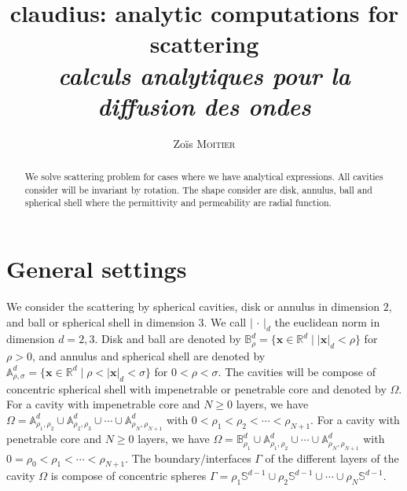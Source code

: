 \documentclass[12pt,a4paper]{article}
\title{claudius: analytic computations for scattering \\ \Large \emph{calculs analytiques pour la diffusion des ondes}}
\author{Zoïs \textsc{Moitier}}
\theoremstyle{definition}
\theoremstyle{plain}
\theoremstyle{remark}
\newcommand{\bbA}{\mathbb{A}}
\newcommand{\bbB}{\mathbb{B}}
\newcommand{\bbR}{\mathbb{R}}
\newcommand{\bbS}{\mathbb{S}}
\newcommand{\abs}[1]{\left\lvert#1\right\rvert}
\newcommand{\vx}{\boldsymbol{x}}
\begin{document}
\maketitle

\begin{abstract}
    We solve scattering problem for cases where we have analytical expressions.
    All cavities consider will be invariant by rotation.
    The shape consider are disk, annulus, ball and spherical shell where the permittivity and permeability are radial function.
\end{abstract}

\tableofcontents

\section{General settings}

We consider the scattering by spherical cavities, disk or annulus in dimension $2$, and ball or spherical shell in dimension $3$.
We call $\abs{\,\cdot\,}_d$ the euclidean norm in dimension $d = 2, 3$.
Disk and ball are denoted by $\bbB_\rho^d = \{\vx \in \bbR^d \mid \abs{\vx}_d < \rho\}$ for $\rho > 0$, and annulus and spherical shell are denoted by $\bbA_{\rho, \sigma}^d = \{\vx \in \bbR^d \mid \rho < \abs{\vx}_d < \sigma\}$ for $0 < \rho < \sigma$.
The cavities will be compose of concentric spherical shell with impenetrable or penetrable core and denoted by $\Omega$.
For a cavity with impenetrable core and $N \ge 0$ layers, we have $\Omega = \bbA_{\rho_1, \rho_2}^d \cup \bbA_{\rho_2, \rho_3}^d \cup \cdots \cup \bbA_{\rho_N, \rho_{N+1}}^d$ with $0 < \rho_1 < \rho_2 < \cdots < \rho_{N+1}$.
For a cavity with penetrable core and $N \ge 0$ layers, we have $\Omega = \bbB_{\rho_1}^d \cup \bbA_{\rho_1, \rho_2}^d \cup \cdots \cup \bbA_{\rho_N, \rho_{N+1}}^d$ with $0 = \rho_0 < \rho_1 < \cdots < \rho_{N+1}$.
The boundary/interfaces $\Gamma$ of the different layers of the cavity $\Omega$ is compose of concentric spheres $\Gamma = \rho_1\bbS^{d-1} \cup \rho_2\bbS^{d-1} \cup \cdots \cup \rho_N\bbS^{d-1}$.

\bigskip
\end{document}
